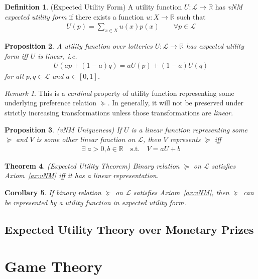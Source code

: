 \documentclass[12pt]{article}
\theoremstyle{plain}
\newtheorem{thm}{Theorem}[section]
\newtheorem{prop}[thm]{Proposition}
\newtheorem{cor}[thm]{Corollary}
\theoremstyle{definition}
\newtheorem{defn}[thm]{Definition}
\theoremstyle{remark}
\newtheorem*{rmk}{Remark}
\newcommand{\ra}{\rightarrow}
\newcommand{\calL}{\mathcal{L}}
\newcommand{\R}{\mathbb{R}}
\begin{document}
\begin{defn}(Expected Utility Form)
A utility function $U:\calL\ra \R$ has \emph{vNM expected utility form}
if there exists a function $u:X\ra \R$ such that
\begin{align*}
  U(p) = \sum_{x\in X}u(x)p(x)
  \qquad \forall p \in\calL
\end{align*}
\end{defn}

\begin{prop}
A utility function over lotteries $U:\calL \ra \R$ has expected utility
form iff $U$ is linear, i.e.
\begin{align*}
  U(ap + (1-a)q)
  = aU(p) + (1-a) U(q)
\end{align*}
for all $p,q\in\calL$ and $a\in [0,1]$.
\end{prop}
\begin{rmk}
This is a \emph{cardinal} property of utility function representing some
underlying preference relation $\succeq$. In generally, it will not be
preserved under strictly increasing transformations unless those
transformations are \emph{linear}.
\end{rmk}

\begin{prop}\emph{(vNM Uniqueness)}
If $U$ is a linear function representing some $\succeq$ and $V$ is some
other linear function on $\calL$, then $V$ represents $\succeq$ iff
\begin{align*}
  \exists \; a>0, b \in\R
  \quad
  \text{s.t.}
  \quad
  V = aU+b
\end{align*}
\end{prop}

\begin{thm}\emph{(Expected Utility Theorem)}
Binary relation $\succeq$ on $\calL$ satisfies
Axiom~\ref{ax:vNM} iff it has a linear representation.
\end{thm}

\begin{cor}
If binary relation $\succeq$ on $\calL$ satisfies
Axiom~\ref{ax:vNM}, then $\succeq$ can be represented by a utility
function in expected utility form.
\end{cor}


\clearpage
\subsection{Expected Utility Theory over Monetary Prizes}


\clearpage
\section{Game Theory}
\end{document}
